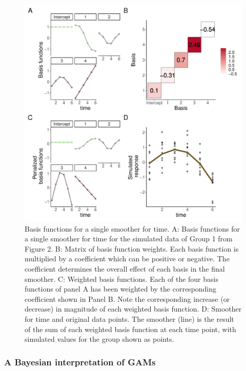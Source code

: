 \documentclass[
]{article}
\begin{document}
\begin{figure}

{\centering \includegraphics[width=0.75\linewidth]{Full_document_SIM_No_Appendix_files/figure-latex/basis-plot-1} 

}

\caption{Basis functions for a single smoother for time. A: Basis functions for a single smoother for time for the simulated data of Group 1 from Figure 2. B: Matrix of basis function weights. Each basis function is multiplied by a coefficient which can be positive or negative. The coefficient determines the overall effect of each basis in the final smoother. C: Weighted basis functions. Each of the four basis functions of panel A has been weighted by the corresponding coefficient shown in Panel B. Note the corresponding increase (or decrease) in magnitude of each weighted basis function. D: Smoother for time and original data points. The smoother (line) is the result of the sum of each weighted basis function at each time point, with simulated values for the group shown as points.}\label{fig:basis-plot}
\end{figure}

\hypertarget{a-bayesian-interpretation-of-gams}{%
\subsubsection{A Bayesian interpretation of GAMs}\label{a-bayesian-interpretation-of-gams}}
\end{document}
